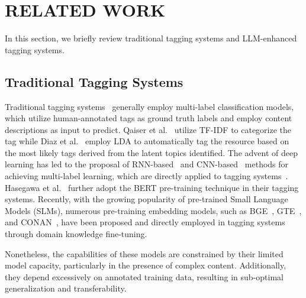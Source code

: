 


\section{RELATED WORK}

In this section, we briefly review traditional tagging systems and LLM-enhanced tagging systems.


\subsection{Traditional Tagging Systems}
Traditional tagging systems~\cite{gupta2010survey,mishne2006autotag,choi2016automatic} generally employ multi-label classification models, which utilize human-annotated tags as ground truth labels and employ content descriptions as input to predict. Qaiser et al.~\cite{qaiser2018text} utilize TF-IDF to categorize the tag while Diaz et al.~\cite{diaz2010lda} employ LDA to automatically tag the resource based on the most likely tags derived from the latent topics identified. The advent of deep learning has led to the proposal of RNN-based~\cite{liu2016recurrent} and CNN-based~\cite{zhang2015sensitivity} methods for achieving multi-label learning, which are directly applied to tagging systems~\cite{wang2015unified, elnagar2019automatic}. Hasegawa et al.~\cite{hasegawa2021bert} further adopt the BERT pre-training technique in their tagging systems. Recently, with the growing popularity of pre-trained Small Language Models (SLMs), numerous pre-training embedding models, such as BGE~\cite{bge}, GTE~\cite{gte}, and CONAN~\cite{conan}, have been proposed and directly employed in tagging systems through domain knowledge fine-tuning.

Nonetheless, the capabilities of these models are constrained by their limited model capacity, particularly in the presence of complex content. Additionally, they depend excessively on annotated training data, resulting in sub-optimal generalization and transferability.



